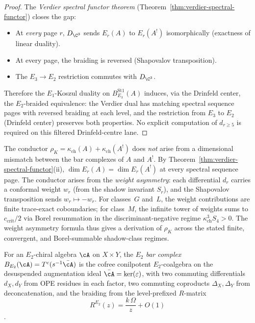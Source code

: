 \begin{proof}
The \emph{Verdier spectral functor theorem}
(Theorem~\ref{thm:verdier-spectral-functor}) closes the gap:
\begin{itemize}
 \item At \emph{every} page $r$, $D_{\C^3}$ sends $E_r(A)$ to $E_r(A^!)$
 isomorphically (exactness of linear duality).
 \item At every page, the braiding is reversed (Shapovalov transposition).
 \item The $E_3 \to E_2$ restriction commutes with $D_{\C^3}$.
\end{itemize}
Therefore the $E_1$-Koszul duality on $B_{E_3}^{\mathrm{St1}}(A)$ induces, via the
Drinfeld center, the $E_2$-braided equivalence: the Verdier dual has
matching spectral sequence pages with reversed braiding at each level,
and the restriction from $E_3$ to $E_2$ (Drinfeld center) preserves
both properties. No
explicit computation of $d_{r \geq 5}$ is required on this filtered
Drinfeld-centre lane.
\end{proof}

\begin{remark}
\label{rem:weight-asymmetry}
The conductor $\rho_K = \kappa_{\mathrm{ch}}(A) + \kappa_{\mathrm{ch}}(A^!)$
does \emph{not} arise from a dimensional mismatch between the bar complexes of
$A$ and $A^!$. By Theorem~\ref{thm:verdier-spectral-functor}(ii),
$\dim E_r(A) = \dim E_r(A^!)$ at every spectral sequence page.
The conductor arises from the \emph{weight asymmetry}: each differential
$d_r$ carries a conformal weight $w_r$ (from the shadow invariant $S_r$),
and the Shapovalov transposition sends $w_r \mapsto -w_r$. For classes~$G$
and~$L$, the weight contributions are finite trace-exact coboundaries;
for class~$M$, the infinite tower of weights sums to $c_{\mathrm{crit}}/2$ via
Borel resummation in the discriminant-negative regime
$\kappa_{\mathrm{ch}}^3S_4>0$. The weight asymmetry formula thus gives
a derivation of $\rho_K$ across the stated finite, convergent, and
Borel-summable shadow-class regimes.
\end{remark}

\begin{construction}
\label{constr:e2-bar}
For an $E_2$-chiral algebra $\cA$ on $X \times Y$, the \emph{$E_2$
bar complex} $B_{E_2}(\cA) = T^c(s^{-1}\bar{\cA})$ is the cofree
conilpotent $E_2$-coalgebra on the desuspended augmentation ideal
$\bar{\cA} = \ker(\varepsilon)$, with two commuting
differentials $d_X, d_Y$ from OPE residues in each factor, two
commuting coproducts $\Delta_X, \Delta_Y$ from deconcatenation, and
the braiding from the level-prefixed $R$-matrix
\[
 R^{E_2}(z) = \frac{k\,\Omega}{z} + O(1)
\].
\end{construction}

